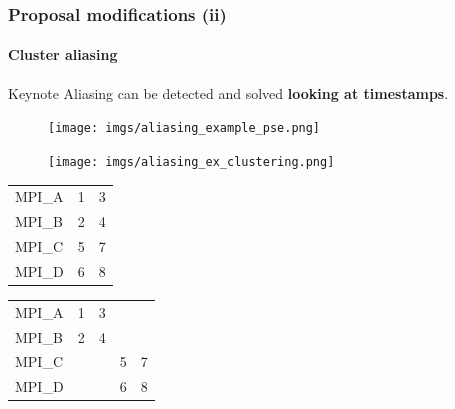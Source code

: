\documentclass{beamer}
\begin{document}
\begin{frame}
	\frametitle{Proposal modifications (ii)}
	\framesubtitle{Cluster aliasing}
	\begin{block}{Keynote}
		Aliasing can be detected and solved \textbf{looking at timestamps}.
	\end{block}
	\begin{multicols}{2}
	\begin{figure}
		\texttt{[image: imgs/aliasing\_example\_pse.png]}
	\end{figure}
	\columnbreak
	\begin{figure}
		\texttt{[image: imgs/aliasing\_ex\_clustering.png]}
	\end{figure}
	\end{multicols}
	\pause
	\begin{multicols}{2}
		\null \vfill
		\begin{table}[]
			\centering
			\begin{tabular}{l|ll}
				MPI\_A & 1 & 3 \\
				MPI\_B & 2 & 4 \\
				MPI\_C & 5 & 7 \\
				MPI\_D & 6 & 8
			\end{tabular}
		\end{table}
		\vfill \null
		\columnbreak
		\pause
		\null \vfill
		\begin{table}[]
			\centering
			\begin{tabular}{l|llll}
				MPI\_A & 1 & 3 &   &   \\
				MPI\_B & 2 & 4 &   &   \\ \hline
				MPI\_C &   &   & 5 & 7 \\
				MPI\_D &   &   & 6 & 8
			\end{tabular}
		\end{table}
		\vfill \null
	\end{multicols}
\end{frame}
\end{document}
